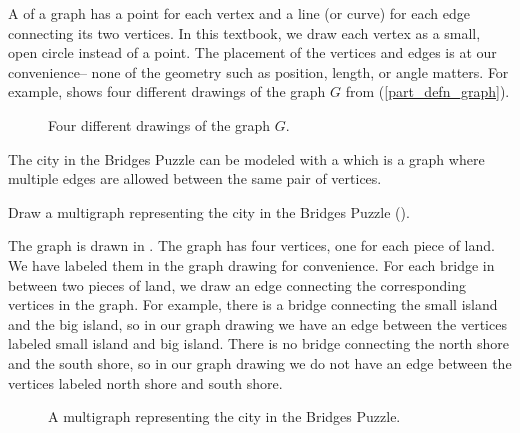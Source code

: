 \begin{defn}[Graph]
\begin{apart}
        \item A  of a graph has a point for each vertex  and a line (or curve) for each edge connecting its two vertices. In this textbook, we draw each vertex as a small, open circle instead of a point.  The placement of the vertices and edges is at our convenience-- none of the geometry such as position, length, or angle matters. For example,  shows four different drawings of the graph $G$ from (\ref{part_defn_graph}).  
  
        \begin{figure}[hbtp]
            \centering          
                            
            \caption{Four different drawings of the graph $G$.}
            \label{fig_four_drawings_K4_minus_edge}
        \end{figure}            
    \end{apart}
\end{defn}

The city in the Bridges Puzzle can be modeled with a  which is a graph where multiple edges are allowed between the same pair of vertices.

\begin{exam}
\label{exam_bridges_graph}
    Draw a multigraph representing the city in the Bridges Puzzle ().
        \begin{soln}
            The graph is drawn in .  The graph has four vertices, one for each piece of land.  We have labeled them in the graph drawing for convenience.  For each bridge in  between two pieces of land, we draw an edge connecting the corresponding vertices in the graph.  For example, there is a bridge connecting the small island and the big island, so in our graph drawing we have an edge between the vertices labeled small island and big island.  There is no bridge connecting the north shore and the south shore, so in our graph drawing we do not have an edge between the vertices labeled north shore and south shore.
            
            \begin{figure}[hbtp]
                \centering
                
                \caption{A multigraph representing the city in the Bridges Puzzle.}
                \label{fig_bridges_graph}
            \end{figure}  
        \end{soln}
\end{exam}

